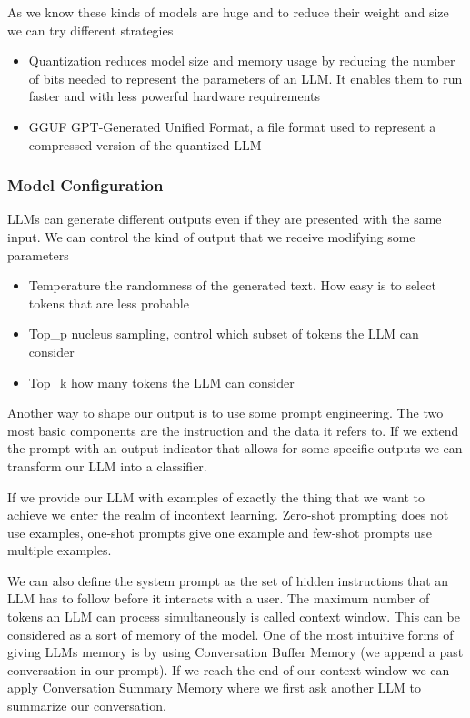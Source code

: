 As we know these kinds of models are huge and to reduce their weight and size we can try different strategies

\begin{itemize}
    \item Quantization \ra reduces model size and memory usage by reducing the number of bits needed to represent the parameters of an LLM. It enables them to run faster and with less powerful hardware requirements
    \item GGUF \ra GPT-Generated Unified Format, a file format used to represent a compressed version of the quantized LLM
\end{itemize}

\subsubsection{Model Configuration}

LLMs can generate different outputs even if they are presented with the same input. We can control the kind of output that we receive modifying some parameters

\begin{itemize}
    \item Temperature \ra the randomness of the generated text. How easy is to select tokens that are less probable
    \item Top\_p \ra nucleus sampling, control which subset of tokens the LLM can consider
    \item Top\_k \ra how many tokens the LLM can consider  
\end{itemize}

Another way to shape our output is to use some prompt engineering. The two most basic components are the instruction and the data it refers to. If we extend the prompt with an output indicator that allows for some specific outputs we can transform our LLM into a classifier. 

\vspace{10pt}

If we provide our LLM with examples of exactly the thing that we want to achieve we enter the realm of incontext learning. Zero-shot prompting does not use examples, one-shot prompts give one example and few-shot prompts use multiple examples. 

\vspace{10pt}

We can also define the system prompt as the set of hidden instructions that an LLM has to follow before it interacts with a user. The maximum number of tokens an LLM can process simultaneously is called context window. This can be considered as a sort of memory of the model. One of the most intuitive forms of giving LLMs memory is by using Conversation Buffer Memory (we append a past conversation in our prompt). If we reach the end of our context window we can apply Conversation Summary Memory where we first ask another LLM to summarize our conversation.  

